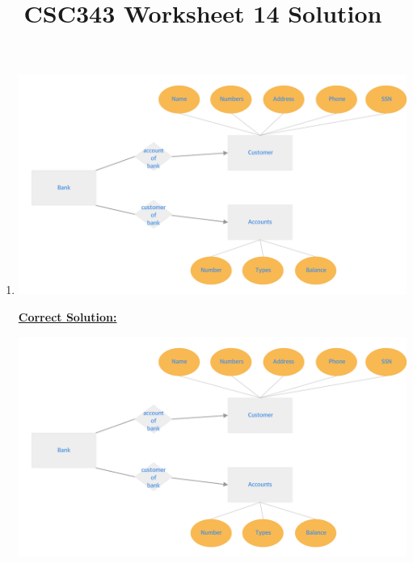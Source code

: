 \documentclass[12pt]{article}
\begin{document}
\title{CSC343 Worksheet 14 Solution}
\maketitle

\begin{enumerate}[1.]
    \item

    \begin{center}
    \includegraphics[width=\linewidth]{images/worksheet_14_solution_13.png}
    \end{center}

    \bigskip

    \begin{mdframed}
        \underline{\textbf{Correct Solution:}}

        \bigskip

        \begin{center}
        \includegraphics[width=\linewidth]{images/worksheet_14_solution_13.png}
        \end{center}

    \end{mdframed}


\end{enumerate}
\end{document}
